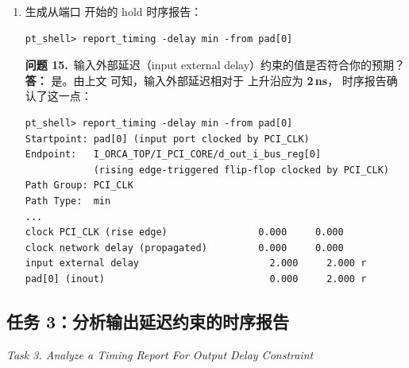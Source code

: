\begin{enumerate}
\begin{questionBox}
\textbf{问题 14.}\ 时钟  在何处定义（时钟定义点）？\\[0.35em]
\textbf{答：} 时钟  在输入端口  处定义。
时钟定义点将时钟源延迟与时钟网络延迟分开。
\end{questionBox}

  \item 生成从端口  开始的 hold 时序报告：
\begin{lstlisting}
pt_shell> report_timing -delay min -from pad[0]
\end{lstlisting}

\begin{questionBox}
\textbf{问题 15.}\ 输入外部延迟（input external delay）约束的值是否符合你的预期？\\[0.35em]
\textbf{答：} 是。由上文  可知，输入外部延迟相对于  上升沿应为 \textbf{2\,ns}，
时序报告确认了这一点：
\begin{lstlisting}
pt_shell> report_timing -delay min -from pad[0]
Startpoint: pad[0] (input port clocked by PCI_CLK)
Endpoint:   I_ORCA_TOP/I_PCI_CORE/d_out_i_bus_reg[0]
            (rising edge-triggered flip-flop clocked by PCI_CLK)
Path Group: PCI_CLK
Path Type:  min
...
clock PCI_CLK (rise edge)                0.000     0.000
clock network delay (propagated)         0.000     0.000
input external delay                       2.000     2.000 r
pad[0] (inout)                             0.000     2.000 r
\end{lstlisting}
\end{questionBox}
\end{enumerate}

\subsection{任务 3：分析输出延迟约束的时序报告}
\label{lab2:task3}

\noindent\textit{Task 3. Analyze a Timing Report For Output Delay Constraint}

